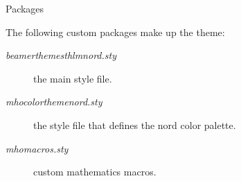 \documentclass[\string~/GitHub/sthlmNordBeamerTheme/sthlmNordLightDemo.tex]{subfiles}
\begin{document}
\begin{frame}[t,fragile]{Packages}

	The following custom packages make up the \snord theme:
	\begin{description}
		\item[\textit{beamerthemesthlmnord.sty}] the main style file.
		\item[\textit{mhocolorthemenord.sty}] the style file that defines the nord color palette.
		\item[\textit{mhomacros.sty}] custom mathematics macros.
	\end{description}

\end{frame}
\end{document}
